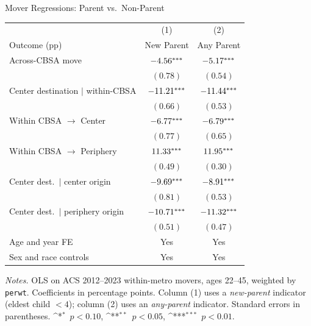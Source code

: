 \documentclass[11pt,aspectratio=169]{beamer}
\newcommand{\sym}[1]{\ifmmode^{#1}\else\(^{#1}\)\fi}
\begin{document}
\begin{frame}{Mover Regressions: Parent vs.\ Non-Parent \; \hyperlink{movers_body}{}}
\label{mover_regressions}
\begin{table}[htbp]\centering
\scriptsize
\begin{tabular}{l*{2}{c}}
\toprule
 & \multicolumn{1}{c}{(1)} & \multicolumn{1}{c}{(2)} \\
Outcome (pp) & New Parent & Any Parent \\
\midrule
Across-CBSA move                        & $-4.56\sym{***}$ & $-5.17\sym{***}$ \\
                                        & $(0.78)$ & $(0.54)$ \\
Center destination $\mid$ within-CBSA   & $-11.21\sym{***}$ & $-11.44\sym{***}$ \\
                                        & $(0.66)$ & $(0.53)$ \\
Within CBSA $\to$ Center                & $-6.77\sym{***}$ & $-6.79\sym{***}$ \\
                                        & $(0.77)$ & $(0.65)$ \\
Within CBSA $\to$ Periphery             & $11.33\sym{***}$ & $11.95\sym{***}$ \\
                                        & $(0.49)$ & $(0.30)$ \\
Center dest.\ $\mid$ center origin      & $-9.69\sym{***}$ & $-8.91\sym{***}$ \\
                                        & $(0.81)$ & $(0.53)$ \\
Center dest.\ $\mid$ periphery origin   & $-10.71\sym{***}$ & $-11.32\sym{***}$ \\
                                        & $(0.51)$ & $(0.47)$ \\
\midrule
Age and year FE                         & Yes & Yes \\
Sex and race controls                   & Yes & Yes \\
\bottomrule
\end{tabular}
\end{table}
\vspace{-0.8em}
\begin{flushleft}\tiny
\textit{Notes.} OLS on ACS 2012--2023 within-metro movers, ages 22--45, weighted by \texttt{perwt}. Coefficients in percentage points. Column (1) uses a \emph{new-parent} indicator (eldest child $<4$); column (2) uses an \emph{any-parent} indicator. Standard errors in parentheses. \sym{*}~$p<0.10$, \sym{**}~$p<0.05$, \sym{***}~$p<0.01$.
\end{flushleft}
\end{frame}
\end{document}
